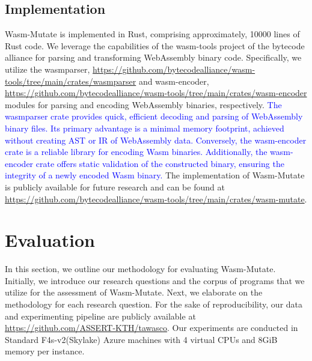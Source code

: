 \documentclass[a4paper,fleqn]{cas-dc}
\newcommand*\badge[1]{ \colorbox{red}{\color{white}#1}}
\newcommand{\tool}{{\sc Wasm-Mutate}\xspace}
\newcommand{\revision}[1]{\textcolor{blue}{#1}}
\newcommand{\repourl}{\url{https://github.com/bytecodealliance/wasm-tools/tree/main/crates/wasm-mutate}}
\newcommand{\dataurl}{\url{https://github.com/ASSERT-KTH/tawasco}}
\newcommand{\todo}[1]{%
\refstepcounter{todo}
\noindent\textbf{\badge{TODO}} {\color{red}#1}
\addcontentsline{td}{todo}
{\color{red}\thesection.\thetodo\xspace #1}}
\begin{document}
\subsection{Implementation}

\tool is implemented in Rust, comprising approximately, 10000 lines of Rust code. 
We leverage the capabilities of the wasm-tools project of the bytecode alliance for parsing and transforming WebAssembly binary code. 
Specifically, we utilize the wasmparser, \url{https://github.com/bytecodealliance/wasm-tools/tree/main/crates/wasmparser} and wasm-encoder, \url{https://github.com/bytecodealliance/wasm-tools/tree/main/crates/wasm-encoder} modules for parsing and encoding WebAssembly binaries, respectively.
\revision{
The wasmparser crate provides quick, efficient decoding and parsing of WebAssembly binary files.
Its primary advantage is a minimal memory footprint, achieved without creating AST or IR of WebAssembly data.
Conversely, the wasm-encoder crate is a reliable library for encoding Wasm binaries.
Additionally, the wasm-encoder crate offers static validation of the constructed binary, ensuring the integrity of a newly encoded Wasm binary.
}
The implementation of \tool is publicly available for future research and can be found at \repourl.





\section {Evaluation}
\label{eval}

In this section, we outline our methodology for evaluating \tool.
Initially, we introduce our research questions and the corpus of programs that we utilize for the assessment of \tool.
Next, we elaborate on the methodology for each research question.
For the sake of reproducibility, our data and experimenting pipeline are publicly available at \dataurl.
Our experiments are conducted in Standard F4s-v2(Skylake) Azure machines with 4 virtual CPUs and 8GiB memory per instance.

\end{document}
